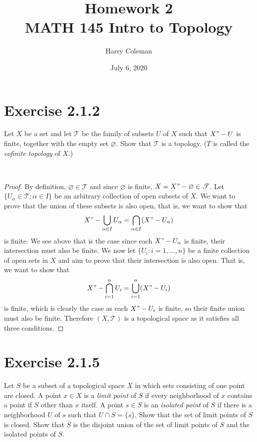 \documentclass[12pt]{article}
\newenvironment{problem}
    {\begin{lrbox}{\mybox}\begin{minipage}{\textwidth-10pt}}
    {\end{minipage}\end{lrbox}\framebox[6.5in]{\usebox{\mybox}}\\}
\newcommand{\clo}[1]{\overline{#1}}
\let\emptyset\varnothing
\newcommand{\T}{\mathscr{T}}
\begin{document}
 
\title{Homework 2\\
    \large MATH 145 Intro to Topology
}
\author{Harry Coleman}
\date{July 6, 2020}
\maketitle

\section*{Exercise 2.1.2}
\begin{problem}
    Let $X$ be a set and let $\T$ be the family of subsets $U$ of $X$ such that $X"-U$ is finite, together with the empty set $\emptyset$. Show that $\T$ is a topology. ($T$ is called the \emph{cofinite topology} of $X$.)
\end{problem}

\begin{proof}
    By definition, $\emptyset\in\T$ and since $\emptyset$ is finite, $X=X"-\emptyset\in\T$. Let $\{U_\alpha \in \T: \alpha\in I\}$ be an arbitrary collection of open subsets of $X$. We want to prove that the union of these subsets is also open, that is, we want to show that
    \[X"-\bigcup_{\alpha\in I}U_\alpha = \bigcap_{\alpha\in I}(X"-U_\alpha)\]
    is finite. We see above that is the case since each $X"-U_\alpha$ is finite, their intersection must also be finite. We now let $\{U_i:i=1,\dots,n\}$ be a finite collection of open sets in $X$ and aim to prove that their intersection is also open. That is, we want to show that
    \[X"-\bigcap_{i=1}^n U_i = \bigcup_{i=1}^n(X"-U_i)\]
    is finite, which is clearly the case as each $X"-U_i$ is finite, so their finite union must also be finite. Therefore $(X,\T)$ is a topological space as it satisfies all three conditions.
    
\end{proof}
 
\section*{Exercise 2.1.5}
\begin{problem}
    Let $S$ be a subset of a topological space $X$ in which sets consisting of one point are closed. A point $x\in X$ is a \emph{limit point} of $S$ if every neighborhood of $x$ contains a point if $S$ other than $x$ itself. A point $s\in S$ is an \emph{isolated point} of $S$ if there is a neighborhood $U$ of $s$ such that $U\cap S=\{s\}$. Show that the set of limit points of $S$ is closed. Show that $\clo{S}$ is the disjoint union of the set of limit points of $S$ and the isolated points of $S$.
\end{problem}
\end{document}
